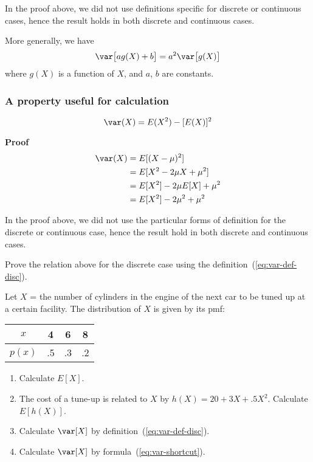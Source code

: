 \documentclass[12pt]{article}
\begin{document}
\note In the proof above, we did not use definitions specific for
discrete or continuous cases, hence
the result holds in both discrete and continuous cases.

More generally, we have
\[
\var\bigl[ag(X) + b\bigr]
= a^2 \var\bigl[g(X)\bigr]
\]
where $g(X)$ is a function of $X$,
and $a$, $b$ are constants.


\subsubsection{A property useful for calculation}

\begin{equation}\label{eq:var-shortcut}
\var(X) = E(X^2) - [E(X)]^2
\end{equation}

\textbf{Proof}
\[\begin{split}
\var(X)
&= E[(X - \mu)^2]
\\
&= E[X^2 - 2\mu X + \mu^2]
\\
&= E[X^2] - 2\mu E[X] + \mu^2
\\
&= E[X^2] - 2\mu^2 + \mu^2
\end{split}
\]


\note In the proof above, we did not use the particular forms
of definition for the discrete or continuous case, hence
the result hold in both discrete and continuous cases.

\exercise Prove the relation above for the discrete case
using the definition~(\ref{eq:var-def-disc}).

\example
Let $X$ = the number of cylinders in the engine of the next car
to be tuned up at a certain facility.
The distribution of $X$ is given by its pmf:
\begin{tabular}{c|ccc}
$x$ & 4 & 6 & 8\\ \hline
$p(x)$ & .5 & .3 & .2
\end{tabular}
\begin{enumerate}
\item Calculate $E[X]$.
\item The cost of a tune-up is related to $X$ by
    $h(X) = 20 + 3X + .5X^2$. Calculate $E[h(X)]$.
\item Calculate $\var[X]$ by definition~(\ref{eq:var-def-disc}).
\item Calculate $\var[X]$ by formula~(\ref{eq:var-shortcut}).
\end{enumerate}
\end{document}
